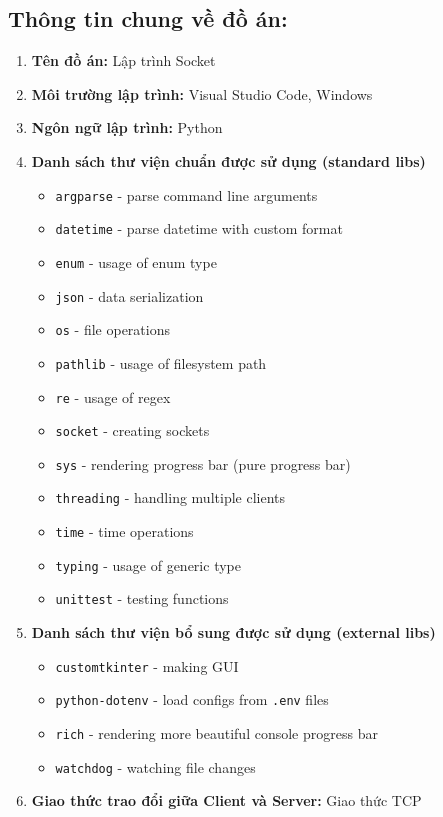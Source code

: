 \documentclass[a4paper,12pt]{report}
\begin{document}
\subsection{Thông tin chung về đồ án:}
\begin{enumerate}
  \item \textbf{Tên đồ án:} Lập trình Socket
  \item \textbf{Môi trường lập trình:} Visual Studio Code, Windows
  \item \textbf{Ngôn ngữ lập trình:} Python
  \item \textbf{Danh sách thư viện chuẩn được sử dụng (standard libs)}
        \begin{itemize}
          \item \verb|argparse| - parse command line arguments
          \item \verb|datetime| - parse datetime with custom format
          \item \verb|enum| - usage of enum type
          \item \verb|json| - data serialization
          \item \verb|os| - file operations
          \item \verb|pathlib| - usage of filesystem path
          \item \verb|re| - usage of regex
          \item \verb|socket| - creating sockets
          \item \verb|sys| - rendering progress bar (pure progress bar)
          \item \verb|threading| - handling multiple clients
          \item \verb|time| - time operations
          \item \verb|typing| - usage of generic type
          \item \verb|unittest| - testing functions
        \end{itemize}
  \item \textbf{Danh sách thư viện bổ sung được sử dụng (external libs)}
        \begin{itemize}
          \item \verb|customtkinter| - making GUI
          \item \verb|python-dotenv| - load configs from \verb|.env| files
          \item \verb|rich| - rendering more beautiful console progress bar
          \item \verb|watchdog| - watching file changes
        \end{itemize}
  \item  \textbf{Giao thức trao đổi giữa Client và Server:} Giao thức TCP
\end{enumerate}
\end{document}
